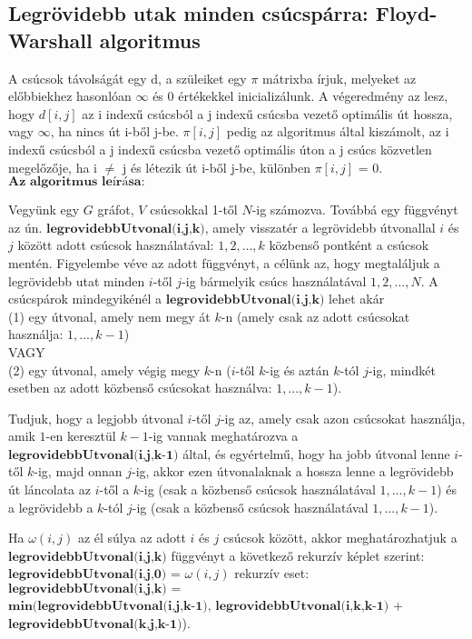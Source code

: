 \documentclass[margin=0px]{article}
\begin{document}
\subsection{Legrövidebb utak minden csúcspárra: Floyd-Warshall algoritmus}

A csúcsok távolságát egy d, a szüleiket egy $\pi$ mátrixba írjuk, melyeket az előbbiekhez hasonlóan $\infty$ és 0 értékekkel inicializálunk. A végeredmény az lesz, hogy $d[i, j]$ az i indexű csúcsból a j indexű csúcsba vezető optimális út hossza, vagy $\infty$, ha nincs út i-ből j-be. $\pi[i, j]$ pedig az algoritmus által kiszámolt, az i indexű csúcsból a j indexű csúcsba vezető optimális úton a j csúcs közvetlen megelőzője, ha i $\ne$ j és létezik út i-ből j-be, különben $\pi[i, j]$ = 0.
$\textbf{Az algoritmus leírása:}$

Vegyünk egy $G$ gráfot, $V$ csúcsokkal 1-től $N$-ig számozva. Továbbá egy függvényt az ún. $\textbf{legrovidebbUtvonal(i,j,k)}$, amely visszatér a legrövidebb útvonallal $i$ és $j$ között adott csúcsok használatával: ${1,2,...,k}$ közbenső pontként a csúcsok mentén. Figyelembe véve az adott függvényt, a célünk az, hogy megtaláljuk a legrövidebb utat minden $i$-től $j$-ig bármelyik csúcs használatával ${1,2,...,N}$.
A csúcspárok mindegyikénél a $\textbf{legrovidebbUtvonal(i,j,k)}$ lehet akár\\
(1) egy útvonal, amely nem megy át $k$-n (amely csak az adott csúcsokat használja: ${1,...,k-1}$)\\
VAGY\\
(2) egy útvonal, amely végig megy $k$-n ($i$-től $k$-ig és aztán $k$-tól $j$-ig, mindkét esetben az adott közbenső csúcsokat használva: ${1,...,k-1}$).

Tudjuk, hogy a legjobb útvonal $i$-től $j$-ig az, amely csak azon csúcsokat használja, amik $1$-en keresztül $k-1$-ig vannak meghatározva a $\textbf{legrovidebbUtvonal(i,j,k-1)}$ által, és egyértelmű, hogy ha jobb útvonal lenne $i$-től $k$-ig, majd onnan $j$-ig, akkor ezen útvonalaknak a hossza lenne a legrövidebb út láncolata az $i$-től a $k$-ig (csak a közbenső csúcsok használatával ${1,...,k-1}$) és a legrövidebb a $k$-tól $j$-ig (csak a közbenső csúcsok használatával ${1,...,k-1}$).

Ha $\omega(i,j)$ az él súlya az adott $i$ és $j$ csúcsok között, akkor meghatározhatjuk a $\textbf{legrovidebbUtvonal(i,j,k)}$ függvényt a következő rekurzív képlet szerint:
$\textbf{legrovidebbUtvonal(i,j,0)}$ = $\omega(i,j)$
rekurzív eset:\\
$\textbf{legrovidebbUtvonal(i,j,k) =}$\\
$\textbf{min(legrovidebbUtvonal(i,j,k-1), legrovidebbUtvonal(i,k,k-1)}$ + $\textbf{legrovidebbUtvonal(k,j,k-1)}$).
\end{document}
